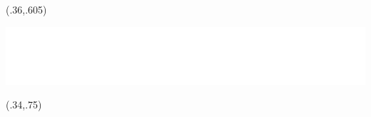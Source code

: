 \begin{textblock}{.6}(.36,.605)
	\begin{center}
		\includegraphics[width=.575\paperwidth]{images/copertina1}
	\end{center}
\end{textblock}


\begin{textblock}{.3}(.34,.75)
\end{textblock}



